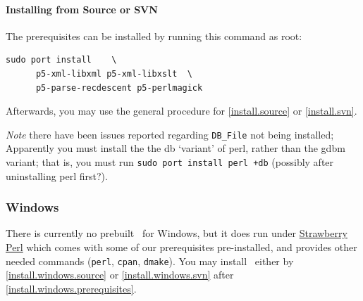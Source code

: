 \documentclass{article}
\begin{document}
\paragraph{Installing from Source or SVN}
The prerequisites can be installed by running this command as root: 
\begin{lstlisting}[style=shell]
  sudo port install    \
      p5-xml-libxml p5-xml-libxslt  \
      p5-parse-recdescent p5-perlmagick
\end{lstlisting}
Afterwards, you may use the general procedure for
\ref{install.source} or \ref{install.svn}.

\emph{Note} there have been issues reported regarding \verb|DB_File|
not being installed;  Apparently you must install the 
the db `variant' of perl, rather than the gdbm variant;
that is, you must run \verb|sudo port install perl +db|
(possibly after uninstalling perl first?).

\subsubsection{Windows}\label{install.windows}
There is currently no prebuilt \LaTeXML\ for Windows,
but it does run under \href{http://strawberryperl.com}{Strawberry Perl}
which comes with some of our prerequisites pre-installed,
and provides other needed commands (\texttt{perl}, \texttt{cpan}, \texttt{dmake}).
You may install \LaTeXML\ either by \ref{install.windows.source}
or \ref{install.windows.svn} after \ref{install.windows.prerequisites}.
\end{document}
